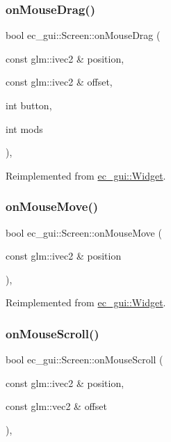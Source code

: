 \subsubsection{\texorpdfstring{on\+Mouse\+Drag()}{onMouseDrag()}}
{\footnotesize\ttfamily bool ec\+\_\+gui\+::\+Screen\+::on\+Mouse\+Drag (\begin{DoxyParamCaption}\item[{const glm\+::ivec2 \&}]{position,  }\item[{const glm\+::ivec2 \&}]{offset,  }\item[{int}]{button,  }\item[{int}]{mods }\end{DoxyParamCaption})\hspace{0.3cm}{\ttfamily [override]}, {\ttfamily [virtual]}}



Reimplemented from \mbox{\hyperlink{classec__gui_1_1_widget_aacc1a265d66b1127f8f4ae968f43ae25}{ec\+\_\+gui\+::\+Widget}}.

\mbox{\label{classec__gui_1_1_screen_a9dc8a7c1650bb6ffb271d13bdea3688a}} 
\subsubsection{\texorpdfstring{on\+Mouse\+Move()}{onMouseMove()}}
{\footnotesize\ttfamily bool ec\+\_\+gui\+::\+Screen\+::on\+Mouse\+Move (\begin{DoxyParamCaption}\item[{const glm\+::ivec2 \&}]{position }\end{DoxyParamCaption})\hspace{0.3cm}{\ttfamily [override]}, {\ttfamily [virtual]}}



Reimplemented from \mbox{\hyperlink{classec__gui_1_1_widget_a22a477e900743ebc57db7703609d7bcc}{ec\+\_\+gui\+::\+Widget}}.

\mbox{\label{classec__gui_1_1_screen_ad0ffcfff7027005dd6cd8d5dcc168a0c}} 
\subsubsection{\texorpdfstring{on\+Mouse\+Scroll()}{onMouseScroll()}}
{\footnotesize\ttfamily bool ec\+\_\+gui\+::\+Screen\+::on\+Mouse\+Scroll (\begin{DoxyParamCaption}\item[{const glm\+::ivec2 \&}]{position,  }\item[{const glm\+::vec2 \&}]{offset }\end{DoxyParamCaption})\hspace{0.3cm}{\ttfamily [override]}, {\ttfamily [virtual]}}



